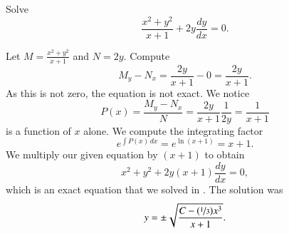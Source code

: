 \documentclass[12pt]{book}
\begin{document}
\begin{example}
Solve
\begin{equation*}
\frac{x^2+y^2}{x+1} + 2y \frac{dy}{dx} = 0 .
\end{equation*}

Let $M= \frac{x^2+y^2}{x+1}$ and $N=2y$.
Compute
\begin{equation*}
M_y-N_x = \frac{2y}{x+1} - 0 = \frac{2y}{x+1} .
\end{equation*}
As this is not zero, the equation is not exact.  We notice 
\begin{equation*}
P(x) = \frac{M_y-N_x}{N} = \frac{2y}{x+1} \frac{1}{2y} = \frac{1}{x+1} 
\end{equation*}
is a function of $x$ alone.    We compute the integrating factor
\begin{equation*}
e^{\int  P(x) \, dx}
=
e^{\ln (x+1)} = x+1 .
\end{equation*}
We multiply our given equation by $(x+1)$ to obtain
\begin{equation*}
x^2+y^2 + 2y(x+1) \frac{dy}{dx} = 0 ,
\end{equation*}
which is an exact equation that we solved in
.  The solution was
\begin{equation*}
y = \pm \sqrt{\frac{C-(\nicefrac{1}{3})x^3}{x+1}} .
\end{equation*}
\end{example}
\end{document}
